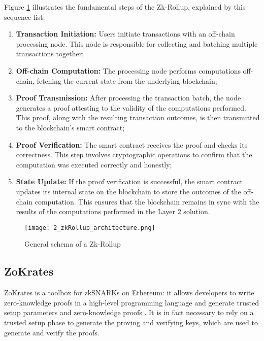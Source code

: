 Figure \ref{fig:2_zkRollup_schema} illustrates the fundamental steps of the Zk-Rollup, explained by this sequence list:
\begin{enumerate}
  \item \textbf{Transaction Initiation:} Users initiate transactions with an off-chain processing node. This node is responsible for collecting and batching multiple transactions together;
  \item \textbf{Off-chain Computation:} The processing node performs computations off-chain, fetching the current state from the underlying blockchain;
  \item \textbf{Proof Transmission:} After processing the transaction batch, the node generates a proof attesting to the validity of the computations performed. This proof, along with the resulting transaction outcomes, is then transmitted to the blockchain's smart contract;
  \item \textbf{Proof Verification:} The smart contract receives the proof and checks its correctness. This step involves cryptographic operations to confirm that the computation was executed correctly and honestly;
  \item \textbf{State Update:} If the proof verification is successful, the smart contract updates its internal state on the blockchain to store the outcomes of the off-chain computation. This ensures that the blockchain remains in sync with the results of the computations performed in the Layer 2 solution.
\end{enumerate}

\begin{figure}[ht]
  \centering
  \texttt{[image: 2\_zkRollup\_architecture.png]}
  \caption[Zk-Rollup Schema]{General schema of a Zk-Rollup\cite{ise_department_tub_material_nodate}}  
  \label{fig:2_zkRollup_schema}
\end{figure}

\subsection{ZoKrates}

ZoKrates is a toolbox for zkSNARKs on Ethereum: it allows developers to write zero-knowledge proofs in a high-level programming language and generate trusted setup parameters and zero-knowledge proofs \cite{eberhardt_ZoKrates_2018}. It is in fact necessary to rely on a trusted setup phase to generate the proving and verifying keys, which are used to generate and verify the proofs.

